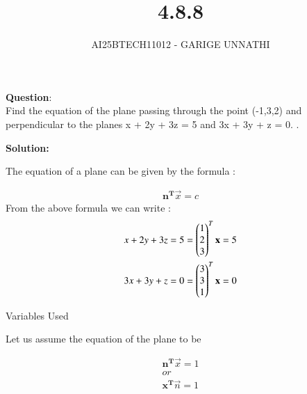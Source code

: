 \documentclass[journal]{IEEEtran}
\begin{document}



\title{4.8.8}
\author{AI25BTECH11012 - GARIGE UNNATHI}
{\let\newpage\relax\maketitle}


\renewcommand{\thefigure}{\theenumi}
\renewcommand{\thetable}{\theenumi}
\setlength{\intextsep}{10pt} %



\vspace{-1cm}

\textbf{Question}:\\
Find the equation of the plane passing through the point (-1,3,2) and perpendicular
to the planes x + 2y + 3z = 5 and 3x + 3y + z = 0. .


\textbf{Solution: }

 

The equation of a plane can be given by the formula :
         
\begin{align*}
    \mathbf{n^{T}}\vec{x} = c
\end{align*}
From the above formula we can write :
\begin{align}
  x + 2y + 3z = 5  = \begin{pmatrix}1\\2\\3\end{pmatrix}^{T}\mathbf{x} = 5\\
  3x + 3y + z = 0  = \begin{pmatrix}3\\3\\1\end{pmatrix}^{T}\mathbf{x} = 0
\end{align}

\begin{table}[h!]    
      \centering
      
      \caption{Variables Used}
      \label{}
    \end{table}


Let us assume the equation of the plane to be

\begin{align}
      \mathbf{n^{T}}\vec{x} = 1\\
      or \\
      \mathbf{x^{T}}\vec{n} = 1
\end{align}
\end{document}
